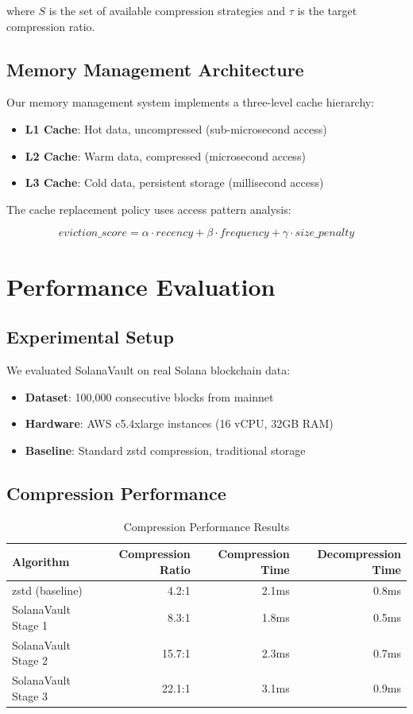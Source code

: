 \documentclass[11pt,a4paper]{article}
\begin{document}
where $S$ is the set of available compression strategies and $\tau$ is the target compression ratio.

\subsection{Memory Management Architecture}

Our memory management system implements a three-level cache hierarchy:

\begin{itemize}
    \item \textbf{L1 Cache}: Hot data, uncompressed (sub-microsecond access)
    \item \textbf{L2 Cache}: Warm data, compressed (microsecond access)
    \item \textbf{L3 Cache}: Cold data, persistent storage (millisecond access)
\end{itemize}

The cache replacement policy uses access pattern analysis:

$$
eviction\_score = \alpha \cdot recency + \beta \cdot frequency + \gamma \cdot size\_penalty
$$

\section{Performance Evaluation}

\subsection{Experimental Setup}

We evaluated SolanaVault on real Solana blockchain data:
\begin{itemize}
    \item \textbf{Dataset}: 100,000 consecutive blocks from mainnet
    \item \textbf{Hardware}: AWS c5.4xlarge instances (16 vCPU, 32GB RAM)
    \item \textbf{Baseline}: Standard zstd compression, traditional storage
\end{itemize}

\subsection{Compression Performance}

\begin{table}[h]
\centering
\caption{Compression Performance Results}
\begin{tabular}{@{}lrrr@{}}
\toprule
Algorithm & Compression Ratio & Compression Time & Decompression Time \\
\midrule
zstd (baseline) & 4.2:1 & 2.1ms & 0.8ms \\
SolanaVault Stage 1 & 8.3:1 & 1.8ms & 0.5ms \\
SolanaVault Stage 2 & 15.7:1 & 2.3ms & 0.7ms \\
SolanaVault Stage 3 & 22.1:1 & 3.1ms & 0.9ms \\
\bottomrule
\end{tabular}
\end{table}
\end{document}
